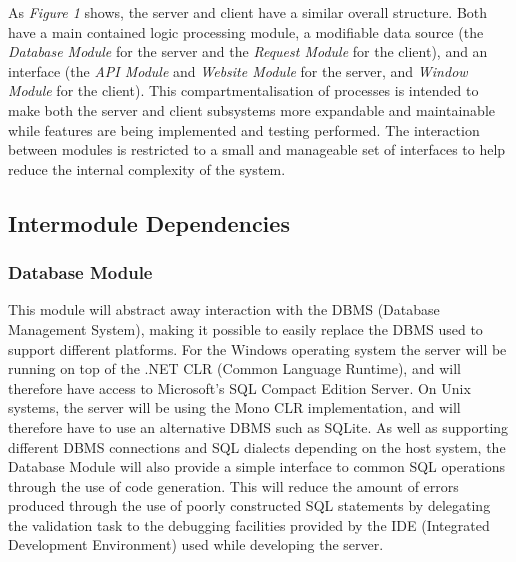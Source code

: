 As \emph{Figure 1} shows, the server and client have a similar overall structure. Both have a main contained logic processing module, a modifiable data source (the \emph{Database Module} for the server and the \emph{Request Module} for the client), and an interface (the \emph{API Module} and \emph{Website Module} for the server, and \emph{Window Module} for the client). This compartmentalisation of processes is intended to make both the server and client subsystems more expandable and maintainable while features are being implemented and testing performed. The interaction between modules is restricted to a small and manageable set of interfaces to help reduce the internal complexity of the system.

\newpage
\subsection{Intermodule Dependencies}
\subsubsection{Database Module}
This module will abstract away interaction with the DBMS (Database Management System), making it possible to easily replace the DBMS used to support different platforms. For the Windows operating system the server will be running on top of the .NET CLR (Common Language Runtime), and will therefore have access to Microsoft's SQL Compact Edition Server. On Unix systems, the server will be using the Mono CLR implementation, and will therefore have to use an alternative DBMS such as SQLite. As well as supporting different DBMS connections and SQL dialects depending on the host system, the Database Module will also provide a simple interface to common SQL operations through the use of code generation. This will reduce the amount of errors produced through the use of poorly constructed SQL statements by delegating the validation task to the debugging facilities provided by the IDE (Integrated Development Environment) used while developing the server.

